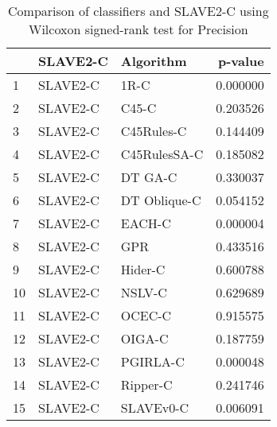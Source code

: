 \begin{table}
\footnotesize
\caption{Comparison of classifiers and SLAVE2-C using Wilcoxon signed-rank test for Precision}
\label{tab:SLAVE2-C wilcoxon Precision comparison}
\begin{tabular}{lllr}
\hline
 & SLAVE2-C & Algorithm & p-value \\
\hline
1 & SLAVE2-C & 1R-C & 0.000000 \\
2 & SLAVE2-C & C45-C & 0.203526 \\
3 & SLAVE2-C & C45Rules-C & 0.144409 \\
4 & SLAVE2-C & C45RulesSA-C & 0.185082 \\
5 & SLAVE2-C & DT GA-C & 0.330037 \\
6 & SLAVE2-C & DT Oblique-C & 0.054152 \\
7 & SLAVE2-C & EACH-C & 0.000004 \\
8 & SLAVE2-C & GPR & 0.433516 \\
9 & SLAVE2-C & Hider-C & 0.600788 \\
10 & SLAVE2-C & NSLV-C & 0.629689 \\
11 & SLAVE2-C & OCEC-C & 0.915575 \\
12 & SLAVE2-C & OIGA-C & 0.187759 \\
13 & SLAVE2-C & PGIRLA-C & 0.000048 \\
14 & SLAVE2-C & Ripper-C & 0.241746 \\
15 & SLAVE2-C & SLAVEv0-C & 0.006091 \\
\hline
\end{tabular}
\end{table}
